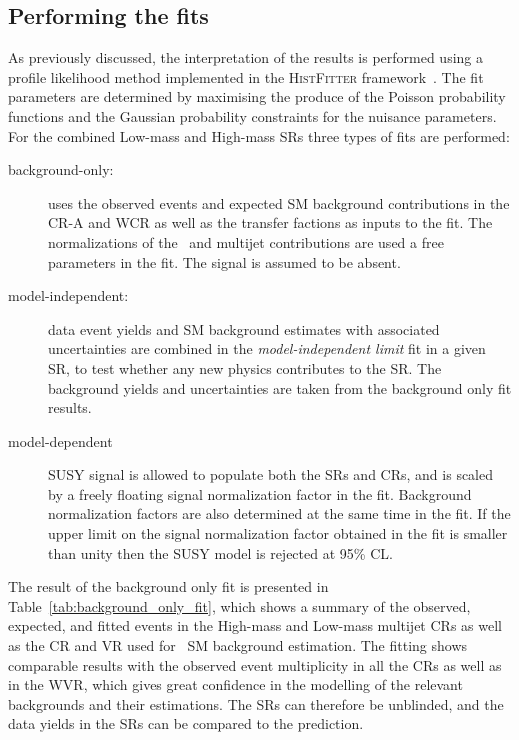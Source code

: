 	\subsection{Performing the fits}
	As previously discussed, the interpretation of the results is performed using a profile likelihood method implemented in the \textsc{HistFitter} framework~\cite{histfitter}.
	The fit parameters are determined by maximising the produce of the Poisson probability functions and the Gaussian probability constraints for the nuisance parameters.
	For the combined Low-mass and High-mass \acp{SR} three types of fits are performed:
	\begin{description}
	\item[background-only:] uses the observed events and expected \ac{SM} background contributions in the \ac{CR}-A and WCR as well as the transfer factions as inputs to the fit. The normalizations of the \Wjets\ and multijet contributions are used a free parameters in the fit. The signal is assumed to be absent.
	\item[model-independent:] data event yields and \ac{SM} background estimates with associated uncertainties are combined in the \textit{model-independent limit} fit in a given \ac{SR}, to test whether any new physics contributes to the \ac{SR}.
	The background yields and uncertainties are taken from the background only fit results. 
	\item[model-dependent] \ac{SUSY} signal is allowed to populate both the \acp{SR} and \acp{CR}, and is scaled by a freely floating signal normalization factor in the fit. Background normalization factors are also determined at the same time in the fit. If the upper limit on the signal normalization factor obtained in the fit is smaller than unity then the \ac{SUSY} model is rejected at 95\% \ac{CL}. 
	\end{description}
	The result of the background only fit is presented in Table~\ref{tab:background_only_fit}, which shows a summary of the observed, expected, and fitted events in the High-mass and Low-mass multijet \acp{CR} as well as the \ac{CR} and \ac{VR} used for \Wjets\ \ac{SM} background estimation.
	The fitting shows comparable results with the observed event multiplicity in all the \acp{CR} as well as in the WVR, which gives great confidence in the modelling of the relevant backgrounds and their estimations. 
	The \acp{SR} can therefore be unblinded, and the data yields in the \acp{SR} can be compared to the prediction.
	\begin{table}[!hbt]
	\centering
	\caption{Observed, expected, and fitted event  yields of \ac{SM} processes in the multijet \acp{CR} and \Wjets\ \ac{CR} and \ac{VR}. The fitted event yields are given after the background-only fit. Uncertainties correspond to the sum in quadrature of statistical and systematic uncertainties.}
	
	\label{tab:background_only_fit}
	\end{table}
	
